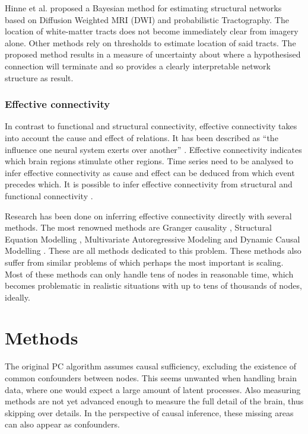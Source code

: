 \documentclass[a4paper, 10pt, english, twocolumn]{article}
\begin{document}
Hinne et al. \cite{hinne2013} proposed a Bayesian method for estimating structural networks based on Diffusion Weighted MRI (DWI) and probabilistic Tractography.
The location of white-matter tracts does not become immediately clear from imagery alone.
Other methods rely on thresholds to estimate location of said tracts.
The proposed method results in a measure of uncertainty about where a hypothesised connection will terminate and so provides a clearly interpretable network structure as result.

\subsubsection*{Effective connectivity}
In contrast to functional and structural connectivity, effective connectivity takes into account the cause and effect of relations.
It has been described as ``the influence one neural system exerts over another'' \cite{friston1994}.
Effective connectivity indicates which brain regions stimulate other regions.
Time series need to be analysed to infer effective connectivity as cause and effect can be deduced from which event precedes which. 
It is possible to infer effective connectivity from structural and functional connectivity \cite{mclntosh1994, harrison2003, friston2003, roebroeck2005}.

Research has been done on inferring effective connectivity directly with several methods.
The most renowned methods are Granger causality \cite{roebroeck2005}, Structural Equation Modelling \cite{mclntosh1994}, Multivariate Autoregressive Modeling \cite{harrison2003} and Dynamic Causal Modelling \cite{friston2003}.
These are all methods dedicated to this problem.
These methods also suffer from similar problems of which perhaps the most important is scaling.
Most of these methods can only handle tens of nodes in reasonable time, which becomes problematic in realistic situations with up to tens of thousands of nodes, ideally.


\section{Methods}
The original PC algorithm assumes causal sufficiency, excluding the existence of common confounders between nodes.
This seems unwanted when handling brain data, where one would expect a large amount of latent processes.
Also measuring methods are not yet advanced enough to measure the full detail of the brain, thus skipping over details.
In the perspective of causal inference, these missing areas can also appear as confounders.
\end{document}
